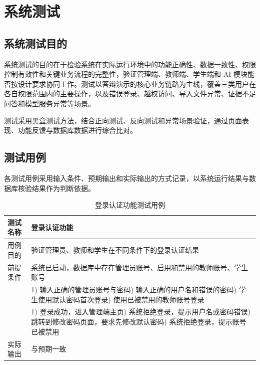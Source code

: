 
\chapter{系统测试}\label{ch:6}

\section{系统测试目的}

系统测试的目的在于检验系统在实际运行环境中的功能正确性、数据一致性、权限控制有效性和关键业务流程的完整性，验证管理端、教师端、学生端和 AI 模块能否按设计要求协同工作。测试以答辩演示的核心业务链路为主线，覆盖三类用户在各自权限范围内的主要操作，以及错误登录、越权访问、导入文件异常、证据不足问答和模型服务异常等场景。

测试采用黑盒测试方法，结合正向测试、反向测试和异常场景验证，通过页面表现、功能反馈与数据库数据进行综合比对。

\section{测试用例}

各测试用例采用输入条件、预期输出和实际输出的方式记录，以系统运行结果与数据库核验结果作为判断依据。

\begin{table}[H]
  \centering
  \caption{登录认证功能测试用例}
  \label{tab:tc-login}
  \footnotesize
  \renewcommand{\arraystretch}{1.35}
  \begin{tabularx}{\textwidth}{|L{2.4cm}|X|}
    \hline
    测试名称 & 登录认证功能 \\
    \hline
    用例目的 & 验证管理员、教师和学生在不同条件下的登录认证结果 \\
    \hline
    前提条件 & 系统已启动，数据库中存在管理员账号、启用和禁用的教师账号、学生账号 \\
    \hline
     &
      1) 输入正确的管理员账号与密码) 输入正确的用户名和错误的密码) 学生使用默认密码首次登录) 使用已被禁用的教师账号登录 \\
    \hline
     &
      1) 登录成功，进入管理端主页) 系统拒绝登录，提示用户名或密码错误) 跳转到修改密码页面，要求先修改默认密码) 系统拒绝登录，提示账号已被禁用 \\
    \hline
    实际输出 & 与预期一致 \\
    \hline
  \end{tabularx}
\end{table}

